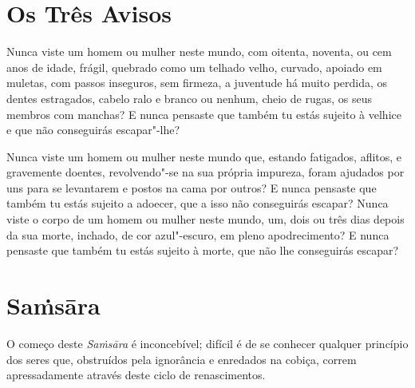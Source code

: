 
\section{Os Três Avisos}

Nunca viste um homem ou mulher neste mundo, com oitenta, noventa, ou cem anos de
idade, frágil, quebrado como um telhado velho, curvado, apoiado em muletas, com
passos inseguros, sem firmeza, a juventude há muito perdida, os dentes
estragados, cabelo ralo e branco ou nenhum, cheio de rugas, os seus membros com
manchas? E nunca pensaste que também tu estás sujeito à velhice e que não
conseguirás escapar"-lhe?

Nunca viste um homem ou mulher neste mundo que, estando fatigados, aflitos, e
gravemente doentes, revolvendo"-se na sua própria impureza, foram ajudados por
uns para se levantarem e postos na cama por outros? E nunca pensaste que também
tu estás sujeito a adoecer, que a isso não conseguirás escapar? Nunca viste o
corpo de um homem ou mulher neste mundo, um, dois ou três dias depois da sua
morte, inchado, de cor azul"-escuro, em pleno apodrecimento? E nunca pensaste que
também tu estás sujeito à morte, que não lhe conseguirás escapar?


\section{Sa\.{m}sāra}

O começo deste \emph{Saṁsāra} é inconcebível; difícil é de se conhecer qualquer
princípio dos seres que, obstruídos pela ignorância e enredados na cobiça,
correm apressadamente através deste ciclo de renascimentos.


